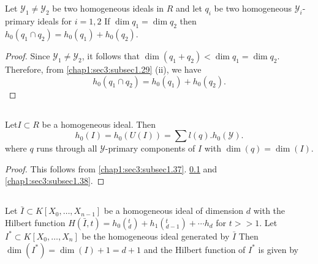  \subsection{}\label{chap1:sec3:subsec1.39}
  Let $\mathscr{Y}_1 \neq \mathscr{Y}_2$ be two homogeneous ideals in
   $R$ and let $q_i$ be two homogeneous $\mathscr{Y}_i$- primary
   ideals for $i=1,2$ If $\dim q_1 = \dim q_2 $ then $h_0 ( q_1 \cap
   q_2) = h_0(q_1) + h_0(q_2)$. 

 \begin{proof}
   Since $\mathscr{Y}_1 \neq \mathscr{Y}_2$,  it follows that $\dim (q_1
   + q_2) < \dim q_1 =\dim q_2$. Therefore,
   from \ref{chap1:sec3:subsec1.29} (ii), we have 
   $$
   h_0 ( q_1 \cap q_2) = h_0(q_1) + h_0(q_2).
   $$
 \end{proof}

\subsection{ }\label{chap1:sec3:subsec1.40}
Let\pageoriginale $ I \subset R$ be a homogeneous ideal. Then 
$$
h_0(I) = h_0(U(I)) = \sum l(q). h_0 (\mathscr{Y}).
$$
where $q$ runs through all $\mathscr{Y}$-primary components of
  $I$ with $\dim (q) = \dim (I)$. 
\begin{proof}
  This follows from
  \ref{chap1:sec3:subsec1.37}. \ref{chap1:sec3:subsec1.39}
  and \ref{chap1:sec3:subsec1.38}. 
\end{proof}

\subsection{}\label{chap1:sec3:subsec1.41}
Let $\bar{I} \subset K[ X_0, \ldots, X_{n-1}]$ be a homogeneous ideal
of dimension $d$ with the Hilbert function $H(\bar{I},t) = h_0(^t_d) +
h_1 (^t_{d-1})+ \cdots h_d$ for $t>>1$. Let $I^{*} \subset K[ X_0, \ldots,
  X_{n}]$ be the homogeneous ideal generated by $\bar{I}$ Then $\dim
(I^{*})= \dim (I) + 1 = d+1$ and the Hilbert function of $I^*$
is given by  

